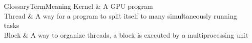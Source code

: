 \begin{notation}%
	\centering
	
	\begin{notationtabular}{Glossary}{Term}{Meaning}
		Kernel & A \gls{GPU} program \\
		Thread & A way for a program to split itself to many simultaneously running tasks \\
		Block & A way to organize threads, a block is executed by a multiprocessing unit \\
	\end{notationtabular}

\end{notation}
